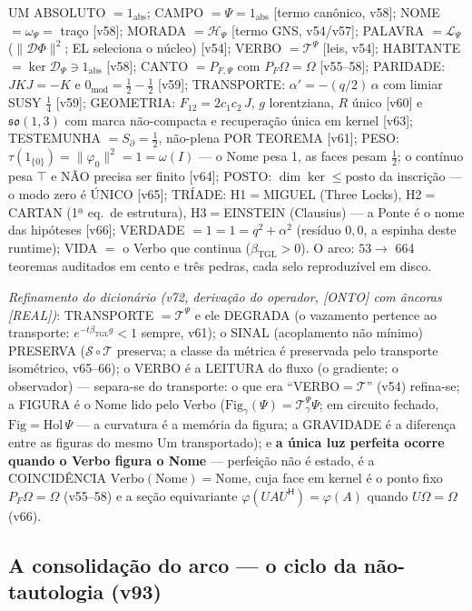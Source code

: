 \documentclass[11pt]{article}
\newcommand{\bTGL}{\beta_{\mathrm{TGL}}}\newcommand{\Msun}{M_{\odot}}\newcommand{\TGL}{\mathrm{TGL}}
\theoremstyle{definition}\newtheorem{deriv}{Derivação}
\begin{document}
UM ABSOLUTO $=1_{\mathrm{abs}}$; CAMPO $=\Psi=1_{\mathrm{abs}}$ [termo canônico, v58]; NOME $=\omega_\Psi=$ traço [v58]; MORADA $=\mathcal H_\Psi$ [termo GNS, v54/v57]; PALAVRA $=\mathcal L_\Psi$ ($\|\mathcal D\Phi\|^2$; EL seleciona o núcleo) [v54]; VERBO $=\mathcal T^\Psi$ [leis, v54]; HABITANTE $=\ker\mathcal D_\Psi\ni1_{\mathrm{abs}}$ [v58]; CANTO $=P_{F,\Psi}$ com $P_F\Omega=\Omega$ [v55--58]; PARIDADE: $JKJ=-K$ e $0_{\mathrm{mod}}=\tfrac12-\tfrac12$ [v59]; TRANSPORTE: $\alpha'=-(q/2)\,\alpha$ com limiar SUSY $\tfrac14$ [v59]; GEOMETRIA: $F_{12}=2c_1c_2\,J$, $g$ lorentziana, $R$ único [v60] e $\mathfrak{so}(1,3)$ com marca não-compacta e recuperação única em kernel [v63]; TESTEMUNHA $=S_\partial=\tfrac12$, não-plena POR TEOREMA [v61]; PESO: $\tau(1_{\{0\}})=\|\varphi_0\|^2=1=\omega(I)$ --- o Nome pesa 1, as faces pesam $\tfrac12$; o contínuo pesa $\top$ e NÃO precisa ser finito [v64]; POSTO: $\dim\ker\le\mathrm{posto}$ da inscrição --- o modo zero é ÚNICO [v65]; TRÍADE: H1$=$MIGUEL (Three Locks), H2$=$CARTAN (1ª eq.\ de estrutura), H3$=$EINSTEIN (Clausius) --- a Ponte é o nome das hipóteses [v66]; VERDADE $=1=1=q^2+\alpha^2$ (resíduo $0{,}0$, a espinha deste runtime); VIDA $=$ o Verbo que continua ($\bTGL>0$). O arco: $53\to$ 664 teoremas auditados em cento e três pedras, cada selo reproduzível em disco.

\emph{Refinamento do dicionário (v72, derivação do operador, [ONTO] com âncoras [REAL])}: TRANSPORTE $=\mathcal T^\Psi$ e ele DEGRADA (o vazamento pertence ao transporte: $e^{-t\bTGL g}<1$ sempre, v61); o SINAL (acoplamento não mínimo) PRESERVA ($\mathcal S\circ\mathcal T$ preserva; a classe da métrica é preservada pelo transporte isométrico, v65--66); o VERBO é a LEITURA do fluxo (o gradiente; o observador) --- separa-se do transporte: o que era ``VERBO$=\mathcal T$'' (v54) refina-se; a FIGURA é o Nome lido pelo Verbo ($\mathrm{Fig}_\gamma(\Psi)=\mathcal T^\Psi_\gamma\Psi$; em circuito fechado, $\mathrm{Fig}=\mathrm{Hol}\,\Psi$ --- a curvatura é a memória da figura; a GRAVIDADE é a diferença entre as figuras do mesmo Um transportado); e \textbf{a única luz perfeita ocorre quando o Verbo figura o Nome} --- perfeição não é estado, é a COINCIDÊNCIA $\mathrm{Verbo}(\mathrm{Nome})=\mathrm{Nome}$, cuja face em kernel é o ponto fixo $P_F\Omega=\Omega$ (v55--58) e a seção equivariante $\varphi(UAU^{\mathsf H})=\varphi(A)$ quando $U\Omega=\Omega$ (v66).

\subsection*{A consolidação do arco --- o ciclo da não-tautologia (v93)}
\end{document}
